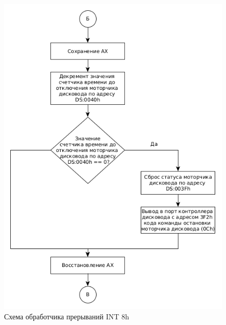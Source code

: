\begin{figure}[ht!]
	\begin{center}
		\includegraphics[scale=0.9]{img/int8h_03}
	\end{center}
	\captionsetup{justification=centering}
	\caption{Схема обработчика прерываний INT 8h}
	\label{img:i3}
\end{figure}
\FloatBarrier

